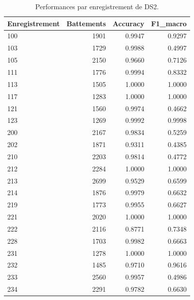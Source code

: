 \begin{table}
\caption{Performances par enregistrement de DS2.}
\label{tab:patients}
\begin{tabular}{lrrr}
\toprule
Enregistrement & Battements & Accuracy & F1_macro \\
\midrule
100 & 1901 & 0.9947 & 0.9297 \\
103 & 1729 & 0.9988 & 0.4997 \\
105 & 2150 & 0.9660 & 0.7126 \\
111 & 1776 & 0.9994 & 0.8332 \\
113 & 1505 & 1.0000 & 1.0000 \\
117 & 1283 & 1.0000 & 1.0000 \\
121 & 1560 & 0.9974 & 0.4662 \\
123 & 1269 & 0.9992 & 0.9998 \\
200 & 2167 & 0.9834 & 0.5259 \\
202 & 1871 & 0.9311 & 0.4385 \\
210 & 2203 & 0.9814 & 0.4772 \\
212 & 2284 & 1.0000 & 1.0000 \\
213 & 2699 & 0.9529 & 0.6599 \\
214 & 1876 & 0.9979 & 0.6632 \\
219 & 1773 & 0.9955 & 0.6627 \\
221 & 2020 & 1.0000 & 1.0000 \\
222 & 2116 & 0.8771 & 0.7348 \\
228 & 1703 & 0.9982 & 0.6663 \\
231 & 1278 & 1.0000 & 1.0000 \\
232 & 1485 & 0.9710 & 0.9616 \\
233 & 2560 & 0.9957 & 0.4986 \\
234 & 2291 & 0.9782 & 0.6630 \\
\bottomrule
\end{tabular}
\end{table}
